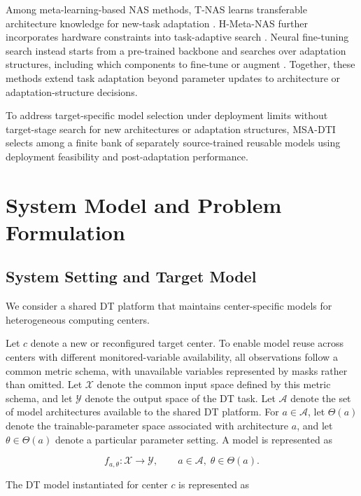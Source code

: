 \documentclass[a4paper,fleqn]{cas-sc}
\begin{document}
Among meta-learning-based NAS methods, T-NAS learns transferable architecture
knowledge for new-task adaptation \cite{ref31}. H-Meta-NAS further incorporates
hardware constraints into task-adaptive search \cite{ref30}. Neural
fine-tuning search instead starts from a pre-trained backbone and searches over
adaptation structures, including which components to fine-tune or augment
\cite{ref32}. Together, these methods extend task adaptation beyond parameter
updates to architecture or adaptation-structure decisions.

To address target-specific model selection under deployment limits without
target-stage search for new architectures or adaptation structures, MSA-DTI
selects among a finite bank of separately source-trained reusable models using
deployment feasibility and post-adaptation performance.

\section{System Model and Problem Formulation}
\label{sec:problem}

\subsection{System Setting and Target Model}

We consider a shared DT platform that maintains center-specific models for
heterogeneous computing centers.

Let $c$ denote a new or reconfigured target center. To enable model reuse
across centers with different monitored-variable availability, all observations
follow a common metric schema, with unavailable variables represented by masks
rather than omitted. Let $\mathcal{X}$ denote the common input space defined by
this metric schema, and let $\mathcal{Y}$ denote the output space of the DT
task. Let $\mathcal{A}$ denote the set of model architectures available to the
shared DT platform. For $a\in\mathcal{A}$, let $\Theta(a)$ denote the
trainable-parameter space associated with architecture $a$, and let
$\theta\in\Theta(a)$ denote a particular parameter setting. A model is
represented as

\begin{equation}
f_{a,\theta}:\mathcal{X}\rightarrow\mathcal{Y},
\qquad
a\in\mathcal{A},\;
\theta\in\Theta(a).
\label{eq:model-family}
\end{equation}

The DT model instantiated for center $c$ is represented as
\end{document}
